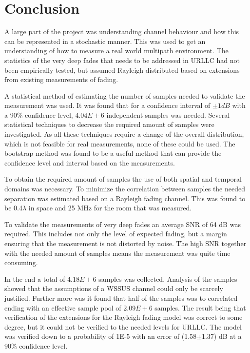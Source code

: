 \chapter{Conclusion}

A large part of the project was understanding channel behaviour and how this can be represented in a stochastic manner. This was used to get an understanding of how to measure a real world multipath environment. The statistics of the very deep fades that needs to be addressed in \gls{URLLC} had not been empirically tested, but assumed Rayleigh distributed based on extensions from existing measurements of fading.

A statistical method of estimating the number of samples needed to validate the measurement was used. It was found that for a confidence interval of $\pm 1dB$ with a 90\% confidence level, $4.04E+6$ independent samples was needed. Several statistical techniques to decrease the required amount of samples were investigated. As all these techniques require a change of the overall distribution, which is not feasible for real measurements, none of these could be used. The bootstrap method was found to be a useful method that can provide the confidence level and interval based on the measurements.

To obtain the required amount of samples the use of both spatial and temporal domains was necessary. To minimize the correlation between samples the needed separation was estimated based on a Rayleigh fading channel. This was found to be 0.4$\lambda$ in space and 25 MHz for the room that was measured. 


To validate the measurements of very deep fades an average SNR of 64 dB was required. This includes not only the level of expected fading, but a margin ensuring that the measurement is not distorted by noise. The high SNR together with the needed amount of samples means the measurement was quite time consuming. 

In the end a total of 4.18$E+6$ samples was collected. Analysis of the samples showed that the assumptions of a WSSUS channel could only be scarcely justified. Further more was it found that half of the samples was to correlated ending with an effective sample pool of 2.09$E+6$ samples. The result being that verification of the extensions for the Rayleigh fading model was correct to some degree, but it could not be verified to the needed levels for \gls{URLLC}. The model was verified down to a probability of 1E-5 with an error of (1.58$\pm$1.37) dB at a 90\% confidence level. 

